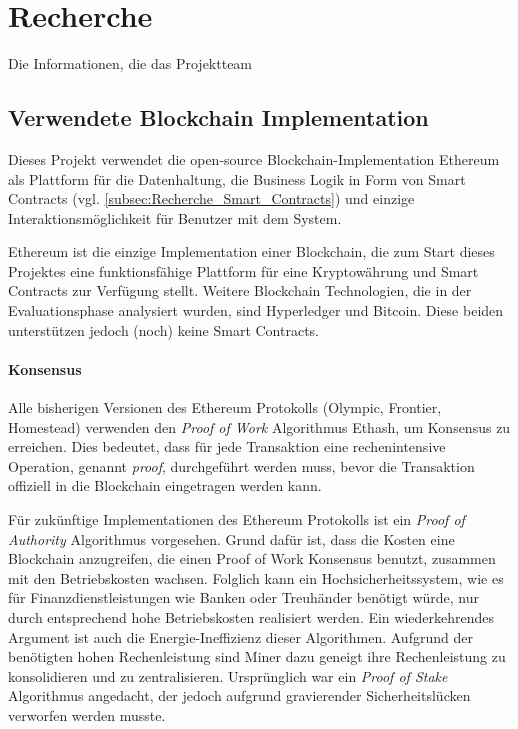 \section{Recherche}
\label{sec:Recherche}
Die Informationen, die das Projektteam

\subsection{Verwendete Blockchain Implementation}
Dieses Projekt verwendet die open-source Blockchain-Implementation Ethereum als Plattform für die Datenhaltung, die Business Logik in Form von Smart Contracts (vgl. \ref{subsec:Recherche_Smart_Contracts}) und einzige Interaktionsmöglichkeit für Benutzer mit dem System.

Ethereum ist die einzige Implementation einer Blockchain, die zum Start dieses Projektes eine funktionsfähige Plattform für eine Kryptowährung und Smart Contracts zur Verfügung stellt. Weitere Blockchain Technologien, die in der Evaluationsphase analysiert wurden, sind Hyperledger und Bitcoin. Diese beiden unterstützen jedoch (noch) keine Smart Contracts.\cite{ethereum.org}\cite[welcome]{wiki.hyperledger.org}

\paragraph{Konsensus}
Alle bisherigen Versionen des Ethereum Protokolls (Olympic, Frontier, Homestead) verwenden den \emph{Proof of Work} Algorithmus Ethash, um Konsensus zu erreichen. Dies bedeutet, dass für jede Transaktion eine rechenintensive Operation, genannt \emph{proof}, durchgeführt werden muss, bevor die Transaktion offiziell in die Blockchain eingetragen werden kann.\cite{Ethash}

Für zukünftige Implementationen des Ethereum Protokolls ist ein \emph{Proof of Authority} Algorithmus vorgesehen. Grund dafür ist, dass die Kosten eine Blockchain anzugreifen, die einen Proof of Work Konsensus benutzt, zusammen mit den Betriebskosten wachsen. Folglich kann ein Hochsicherheitssystem, wie es für Finanzdienstleistungen wie Banken oder Treuhänder benötigt würde, nur durch entsprechend hohe Betriebskosten realisiert werden. Ein wiederkehrendes Argument ist auch die Energie-Ineffizienz dieser Algorithmen. Aufgrund der benötigten hohen Rechenleistung sind Miner dazu geneigt ihre Rechenleistung zu konsolidieren und zu zentralisieren. Ursprünglich war ein \emph{Proof of Stake} Algorithmus angedacht, der jedoch aufgrund gravierender Sicherheitslücken verworfen werden musste.\cite{github.com/ethereum_poa,coinmanual.com/pos,bitcoin.it/pos,cost_nothing_kill_pos,tendermint.com/intro}\cite[{Frequently Asked Questions/What’s the future of Ethereum?}]{ethereum-homestead.readthedocs.io}

